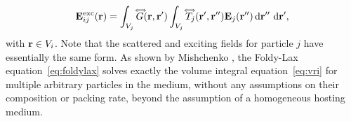 \begin{equation}
\mathbf{E}^\text{exc}_{ij}(\mathbf{r}) = \int_{V_j} \accentset{\Longleftrightarrow}{G}(\mathbf{r},\mathbf{r}')\int_{V_j} \accentset{\Longleftrightarrow}{T}_j(\mathbf{r}',\mathbf{r}'') \mathbf{E}_j(\mathbf{r}'') \,\text{d}\mathbf{r}''\,\,\text{d}\mathbf{r}',
\label{eq:excfield}
\end{equation}
%
with $\mathbf{r}\in V_i$. Note that the scattered and exciting fields for particle $j$ have essentially the same form. 
%
As shown by Mishchenko , the Foldy-Lax equation~\eqref{eq:foldylax} solves exactly the volume integral equation~\eqref{eq:vri} for multiple arbitrary particles in the medium, without any assumptions on their composition or packing rate, beyond the assumption of a homogeneous hosting medium.


